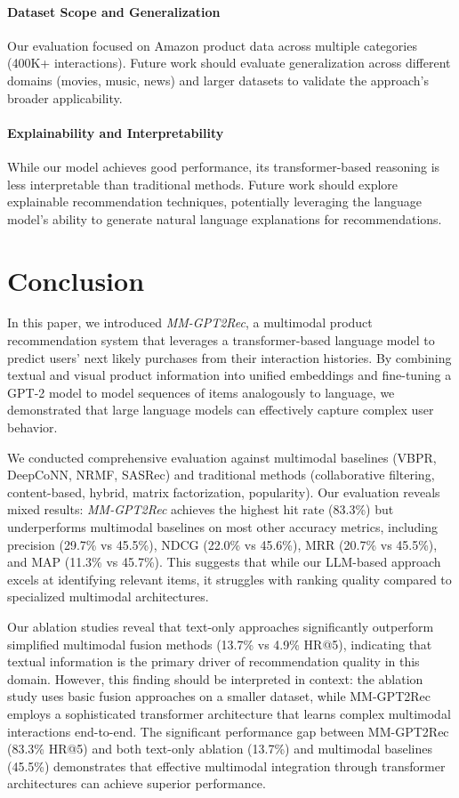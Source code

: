 \documentclass[conference]{IEEEtran}
\begin{document}
\paragraph{Dataset Scope and Generalization} Our evaluation focused on Amazon product data across multiple categories (400K+ interactions). Future work should evaluate generalization across different domains (movies, music, news) and larger datasets to validate the approach's broader applicability.

\paragraph{Explainability and Interpretability} While our model achieves good performance, its transformer-based reasoning is less interpretable than traditional methods. Future work should explore explainable recommendation techniques, potentially leveraging the language model's ability to generate natural language explanations for recommendations.


\section{Conclusion}
In this paper, we introduced \textit{MM-GPT2Rec}, a multimodal product recommendation system that leverages a transformer-based language model to predict users' next likely purchases from their interaction histories. By combining textual and visual product information into unified embeddings and fine-tuning a GPT-2 model to model sequences of items analogously to language, we demonstrated that large language models can effectively capture complex user behavior.

We conducted comprehensive evaluation against multimodal baselines (VBPR, DeepCoNN, NRMF, SASRec) and traditional methods (collaborative filtering, content-based, hybrid, matrix factorization, popularity). Our evaluation reveals mixed results: \textit{MM-GPT2Rec} achieves the highest hit rate (83.3\%) but underperforms multimodal baselines on most other accuracy metrics, including precision (29.7\% vs 45.5\%), NDCG (22.0\% vs 45.6\%), MRR (20.7\% vs 45.5\%), and MAP (11.3\% vs 45.7\%). This suggests that while our LLM-based approach excels at identifying relevant items, it struggles with ranking quality compared to specialized multimodal architectures.

Our ablation studies reveal that text-only approaches significantly outperform simplified multimodal fusion methods (13.7\% vs 4.9\% HR@5), indicating that textual information is the primary driver of recommendation quality in this domain. However, this finding should be interpreted in context: the ablation study uses basic fusion approaches on a smaller dataset, while MM-GPT2Rec employs a sophisticated transformer architecture that learns complex multimodal interactions end-to-end. The significant performance gap between MM-GPT2Rec (83.3\% HR@5) and both text-only ablation (13.7\%) and multimodal baselines (45.5\%) demonstrates that effective multimodal integration through transformer architectures can achieve superior performance.
\end{document}
